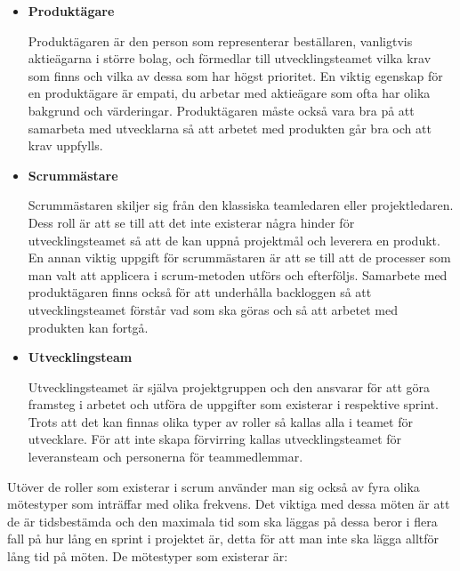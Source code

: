 \begin{itemize}
	\item \textbf{Produktägare}
	
	Produktägaren är den person som representerar beställaren, vanligtvis aktieägarna i större bolag, och förmedlar till utvecklingsteamet vilka krav som finns och vilka av dessa som har högst prioritet. En viktig egenskap för en produktägare är empati, du arbetar med aktieägare som ofta har olika bakgrund och värderingar. Produktägaren måste också vara bra på att samarbeta med utvecklarna så att arbetet med produkten går bra och att krav uppfylls.
	
	\item \textbf{Scrummästare}
	
	Scrummästaren skiljer sig från den klassiska teamledaren eller projektledaren. Dess roll är att se till att det inte existerar några hinder för utvecklingsteamet så att de kan uppnå projektmål och leverera en produkt. En annan viktig uppgift för scrummästaren är att se till att de processer som man valt att applicera i scrum-metoden utförs och efterföljs. Samarbete med produktägaren finns också för att underhålla backloggen så att utvecklingsteamet förstår vad som ska göras och så att arbetet med produkten kan fortgå.
	
	\item \textbf{Utvecklingsteam}
	
	Utvecklingsteamet är själva projektgruppen och den ansvarar för att göra framsteg i arbetet och utföra de uppgifter som existerar i respektive sprint. Trots att det kan finnas olika typer av roller så kallas alla i teamet för utvecklare. För att inte skapa förvirring kallas utvecklingsteamet för leveransteam och personerna för teammedlemmar.	
\end{itemize}

Utöver de roller som existerar i scrum använder man sig också av fyra olika mötestyper som inträffar med olika frekvens. Det viktiga med dessa möten är att de är tidsbestämda och den maximala tid som ska läggas på dessa beror i flera fall på hur lång en sprint i projektet är, detta för att man inte ska lägga alltför lång tid på möten. De mötestyper som existerar är:

